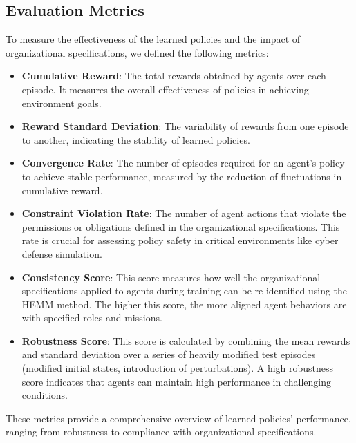 \documentclass[sigconf,anonymous]{aamas}
\begin{document}
\subsection{Evaluation Metrics}

To measure the effectiveness of the learned policies and the impact of organizational specifications, we defined the following metrics:

\begin{itemize}
    \item \textbf{Cumulative Reward}: The total rewards obtained by agents over each episode. It measures the overall effectiveness of policies in achieving environment goals.
    
    \item \textbf{Reward Standard Deviation}: The variability of rewards from one episode to another, indicating the stability of learned policies.
    
    \item \textbf{Convergence Rate}: The number of episodes required for an agent's policy to achieve stable performance, measured by the reduction of fluctuations in cumulative reward.
    
    \item \textbf{Constraint Violation Rate}: The number of agent actions that violate the permissions or obligations defined in the organizational specifications. This rate is crucial for assessing policy safety in critical environments like cyber defense simulation.
    
    \item \textbf{Consistency Score}: This score measures how well the organizational specifications applied to agents during training can be re-identified using the HEMM method. The higher this score, the more aligned agent behaviors are with specified roles and missions.
    
    \item \textbf{Robustness Score}: This score is calculated by combining the mean rewards and standard deviation over a series of heavily modified test episodes (modified initial states, introduction of perturbations). A high robustness score indicates that agents can maintain high performance in challenging conditions.

\end{itemize}

These metrics provide a comprehensive overview of learned policies' performance, ranging from robustness to compliance with organizational specifications.
\end{document}
